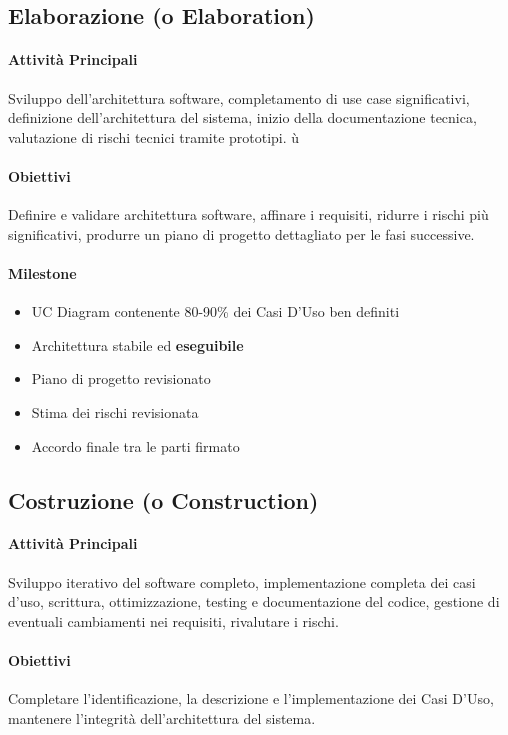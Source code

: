 \subsection{Elaborazione (o Elaboration)}
\label{concept:elaborazione}
\paragraph{Attività Principali} Sviluppo dell'architettura software, completamento di use case significativi, definizione dell'architettura del sistema, inizio della documentazione tecnica, valutazione di rischi tecnici tramite prototipi. ù
\paragraph{Obiettivi} Definire e validare architettura software, affinare i requisiti, ridurre i rischi più significativi, produrre un piano di progetto dettagliato per le fasi successive.
\paragraph{Milestone}
\begin{itemize}
    \item UC Diagram contenente 80-90\% dei Casi D'Uso ben definiti
    \item Architettura stabile ed \textbf{eseguibile}
    \item Piano di progetto revisionato
    \item Stima dei rischi revisionata
    \item Accordo finale tra le parti firmato
\end{itemize}
\subsection{Costruzione (o Construction)}
\label{concept:costruzione}
\paragraph{Attività Principali} Sviluppo iterativo del software completo, implementazione completa dei casi d'uso, scrittura, ottimizzazione, testing e documentazione del codice, gestione di eventuali cambiamenti nei requisiti, rivalutare i rischi.
\paragraph{Obiettivi} Completare l'identificazione, la descrizione e l'implementazione dei Casi D'Uso, mantenere l'integrità dell'architettura del sistema. 
